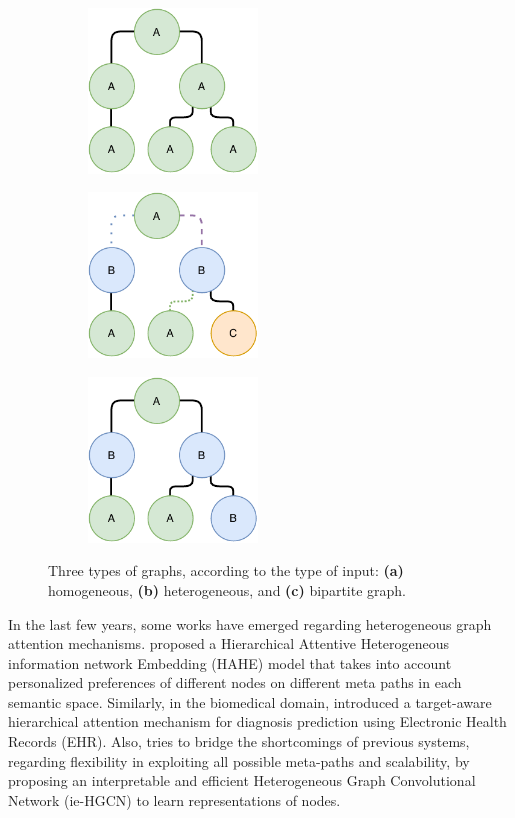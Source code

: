 \begin{figure}[h]
\captionsetup{font=small}
\centering
\begin{subfigure}[b]{0.3\textwidth}
    \includegraphics[width=4.5cm]{images/chapter_2/graph_a.pdf}
    \caption{}
    \label{figure:a}
  \end{subfigure}
  \begin{subfigure}[b]{0.3\textwidth}
    \includegraphics[width=4.5cm]{images/chapter_2/graph_b.pdf}
    \caption{}
    \label{figure:b}
  \end{subfigure}
  \begin{subfigure}[b]{0.3\textwidth}
    \includegraphics[width=4.5cm]{images/chapter_2/graph_c.pdf}
    \caption{}
    \label{figure:c}
  \end{subfigure}
\fontsize{9}{10.8}\caption[Types of Graphs According to Input]{Three types of graphs, according to the type of input: \textbf{(a)} homogeneous, \textbf{(b)} heterogeneous, and \textbf{(c)} bipartite graph.}
\label{figure:graphs}
\end{figure}

In the last few years, some works have emerged regarding heterogeneous graph attention mechanisms. \cite{zhou2019hahe} proposed a Hierarchical Attentive Heterogeneous information network Embedding (HAHE) model that takes into account personalized preferences of different nodes on different meta paths in each semantic space. Similarly, in the biomedical domain, \cite{hosseini2019hierarchical} introduced a target-aware hierarchical attention mechanism for diagnosis prediction using Electronic Health Records (EHR). Also, \cite{yang2020interpretable} tries to bridge the shortcomings of previous systems, regarding flexibility in exploiting all possible meta-paths and scalability, by proposing an interpretable and efficient Heterogeneous Graph Convolutional Network (ie-HGCN) to learn representations of nodes. 

